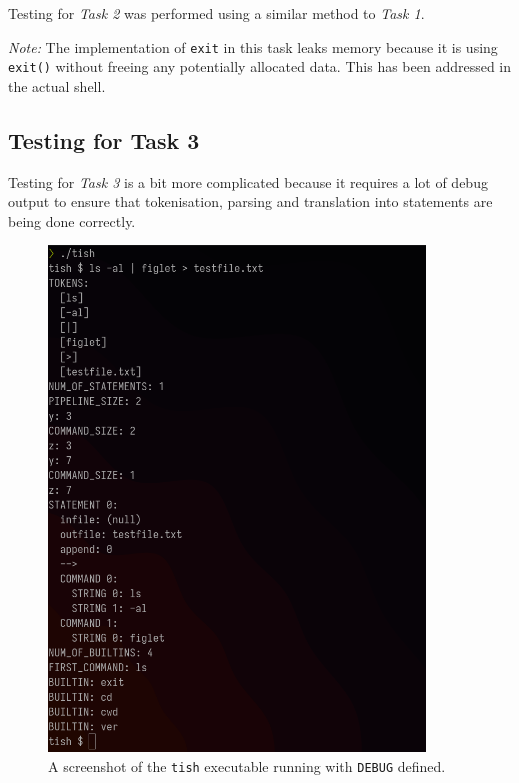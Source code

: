 \documentclass[12pt]{article}
\begin{document}
Testing for \textit{Task 2} was performed using a similar method
to \textit{Task 1}.

\textit{Note:} The implementation of \texttt{exit} in this task
leaks memory because it is using \texttt{exit()} without freeing
any potentially allocated data. This has been addressed in the
actual shell.

\subsection{Testing for Task 3}\label{testing-task3}

Testing for \textit{Task 3} is a bit more complicated because it
requires a lot of debug output to ensure that tokenisation,
parsing and translation into statements are being done
correctly.

\newpage



% 

\begin{figure}[H]
\centering
\includegraphics[width=10cm]{task3and4-test}
\caption{A screenshot of the \texttt{tish} executable running
with \texttt{DEBUG} defined.}
\end{figure}
\end{document}
